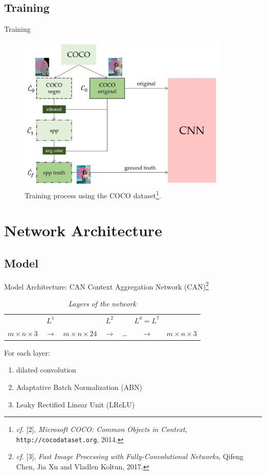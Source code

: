 \documentclass[9pt]{beamer}
\begin{document}
\subsection{Training}
\begin{frame}{Training}
\begin{figure}
    \centering
    \includegraphics[width=0.9\textwidth]{pics/schema-train-img.png}
    \caption{Training process using the COCO dataset\footnote{\textit{cf.} [2], \textit{Microsoft COCO: Common Objects in Context}, \texttt{http://cocodataset.org}, 2014.}.}
\end{figure}

\end{frame}

\section{Network Architecture}
\subsection{Model}
\begin{frame}{Model Architecture: CAN}
Context Aggregation Network (CAN)\footnote{\textit{cf.} [3], \textit{Fast Image Processing with Fully-Convolutional Networks}, Qifeng Chen, Jia Xu and Vladlen Koltun, 2017.}
\begin{table}[!ht]
    \centering
    \begin{tabular}{ccccccc}
        \hline
         & $L^1$ & & $L^2$ & & $L^d=L^7$ & \\
        $m\times n\times 3$ & $\longrightarrow$ &$m\times n\times 24$ & $\longrightarrow$ & \dots & $\longrightarrow$ & $m\times n\times 3$ \\
        \hline
    \end{tabular}
    \caption{\textit{Layers of the network}}
\end{table}
For each layer:
\begin{enumerate}
    \item dilated convolution
    \item Adaptative Batch Normalization (ABN)
    \item Leaky Rectified Linear Unit (LReLU)
\end{enumerate}
\end{frame}
\end{document}
